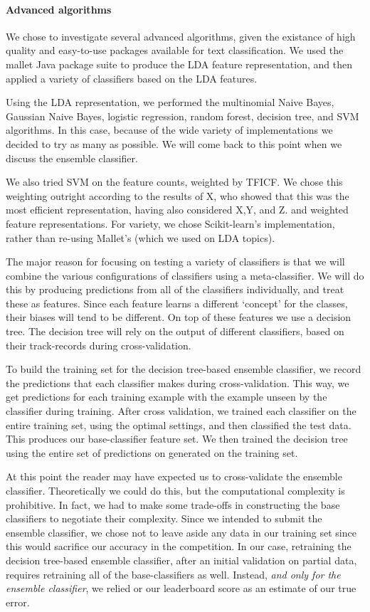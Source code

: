 \documentclass[conference,letterpaper]{IEEEtran}
\begin{document}
\paragraph{Advanced algorithms}
We chose to investigate several advanced algorithms, given the existance of
high quality and easy-to-use packages available for text classification.
We used the mallet Java package suite to produce the LDA feature representation, 
and then applied a variety of classifiers based on the LDA features.

Using the LDA representation, we performed the multinomial Naive 
Bayes, Gaussian Naive Bayes, logistic regression, random forest, decision tree,
and SVM algorithms.  In this case, because of the wide variety of 
implementations we decided to try as many as possible.  We will come back to
this point when we discuss the ensemble classifier.  

We also tried SVM on the feature counts, weighted by TFICF.  We chose this 
weighting outright according to the results of X, who showed that this was
the most efficient representation, having also considered X,Y, and Z.  and 
weighted feature representations.  For variety, we chose Scikit-learn's 
implementation, rather than re-using Mallet's (which we used on LDA topics).

The major reason for focusing on testing a variety of classifiers is that
we will combine the various configurations of classifiers using a meta-classifier.
We will do this by producing predictions from all of the 
classifiers individually, and treat these as features.  Since each 
feature learns a different `concept' for the classes, their biases will
tend to be different.  On top of these features we use a decision tree.
The decision tree will rely on the output of different classifiers, based 
on their track-records during cross-validation.

To build the training set for the decision tree-based ensemble classifier,
we record the predictions that each classifier makes during cross-validation.
This way, we get predictions for each training example with the example
unseen by the classifier during training. After cross validation, we trained
each classifier on the entire training set, using the optimal settings, and
then classified the test data.  This produces our base-classifier feature set.
We then trained the decision tree using the entire set of predictions on
generated on the training set.

At this point the reader may have expected us to cross-validate the 
ensemble classifier.  Theoretically we could do this, but the computational
complexity is prohibitive.  In fact, we had to make some trade-offs in 
constructing the base classifiers to negotiate their complexity.  Since we
intended to submit the ensemble classifier, we chose not to leave aside any
data in our training set since this would sacrifice our accuracy in the
competition.  In our case, retraining the decision tree-based ensemble
classifier, after an initial validation on partial data, requires
retraining all of the base-classifiers as well.  Instead, 
\textit{and only for the ensemble classifier}, we relied or our leaderboard 
score as an estimate of our true error.
\end{document}
